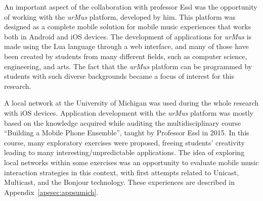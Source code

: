 An important aspect of the collaboration with professor Essl was the opportunity of working with the \textit{urMus} platform, developed by him.
This platform was designed as a complete mobile solution for mobile music experiences that works both in Android and iOS devices.
The development of applications for \textit{urMus} is made using the Lua language through a web interface, and many of those have been created by students from many different fields, such as computer science, engineering, and arts. The fact that the \textit{urMus} platform can be programmed by students with such diverse backgrounds became a focus of interest for this research. 
%


A local network at the University of Michigan was used during the whole research with iOS devices.
Application development with the \textit{urMus} platform was mostly based on the knowledge acquired while auditing the multidisciplinary course ``Building a Mobile Phone Ensemble'', taught by Professor Essl in 2015.
In this course, many exploratory exercises were proposed, freeing students' creativity leading to many interesting/unpredictable applications.
The idea of exploring local networks within some exercises was an opportunity to evaluate mobile music interaction strategies in this context, with first attempts related to Unicast, Multicast, and the Bonjour technology.
These experiences are described in Appendix~\ref{apesec:appsumich}.


